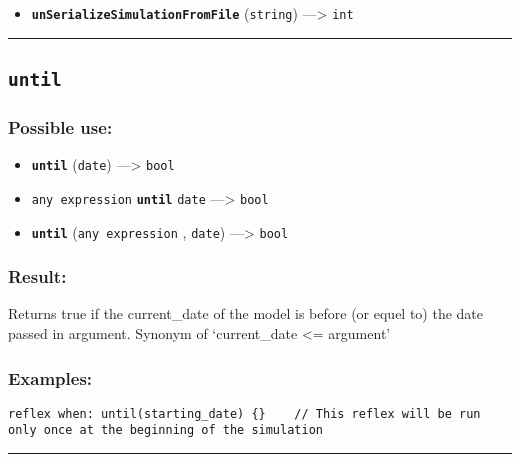 \documentclass[]{book}
\providecommand{\tightlist}{%
  \setlength{\itemsep}{0pt}\setlength{\parskip}{0pt}}
\theoremstyle{definition}
\theoremstyle{definition}
\theoremstyle{definition}
\theoremstyle{remark}
\begin{document}
\begin{itemize}
\tightlist
\item
  \textbf{\texttt{unSerializeSimulationFromFile}} (\texttt{string})
  ---\textgreater{} \texttt{int}
\end{itemize}

\begin{center}\rule{0.5\linewidth}{\linethickness}\end{center}

\subsection{\texorpdfstring{\texttt{until}}{until}}\label{until}

\subsubsection{Possible use:}\label{possible-use-542}

\begin{itemize}
\tightlist
\item
  \textbf{\texttt{until}} (\texttt{date}) ---\textgreater{}
  \texttt{bool}
\item
  \texttt{any\ expression} \textbf{\texttt{until}} \texttt{date}
  ---\textgreater{} \texttt{bool}
\item
  \textbf{\texttt{until}} (\texttt{any\ expression} , \texttt{date})
  ---\textgreater{} \texttt{bool}
\end{itemize}

\subsubsection{Result:}\label{result-522}

Returns true if the current\_date of the model is before (or equel to)
the date passed in argument. Synonym of `current\_date \textless{}=
argument'

\subsubsection{Examples:}\label{examples-374}

\begin{verbatim}
reflex when: until(starting_date) {}    // This reflex will be run only once at the beginning of the simulation 
\end{verbatim}

\begin{center}\rule{0.5\linewidth}{\linethickness}\end{center}
\end{document}
